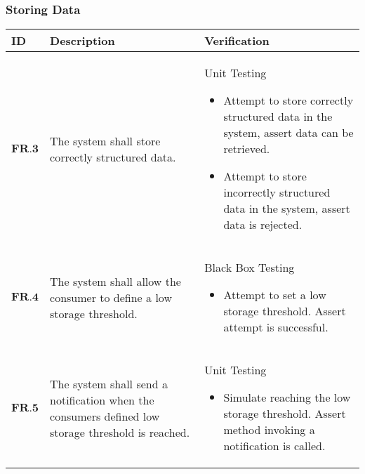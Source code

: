 \subsubsection{Storing Data}
\begin{longtable}[H]{| p{1.5cm} | p{6cm} | p{9cm}| }
        \hline
        \cellcolor{titleColor}\textbf{ID}    & \cellcolor{titleColor}\textbf{Description}                                                                                                                           & \cellcolor{titleColor}\textbf{Verification}                                                                                                                                                                                                                                                                    
        \\ \hline
        $\textbf{FR.3}$  & The system shall store correctly structured data.                                                                                              & Unit Testing\begin{itemize} \item Attempt to store correctly structured data in the system, assert data can be retrieved.\item Attempt to store incorrectly structured data in the system, assert data is rejected.\end{itemize}                                \\ \hline
        $\textbf{FR.4} $ & The system shall allow the consumer to define a low storage threshold.                                                                         & Black Box Testing\begin{itemize} \item Attempt to set a low storage threshold. Assert attempt is successful.\end{itemize}                                                                                                                                                           \\ \hline
        $\textbf{FR.5}$  & The system shall send a notification when the consumers defined low storage threshold is reached.                                              & Unit Testing\begin{itemize} \item Simulate reaching the low storage threshold. Assert method invoking a notification is called.\end{itemize}                                                                                                                               \\ \hline

\end{longtable}
